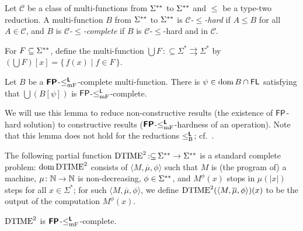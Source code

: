 \documentclass[envcountsame,orivec,oribibl]{llncs}
\newcommand{\pcolon}{\mathpunct{\,:\subseteq}}
\begin{document}
Let $\mathcal{C}$ be a class of multi-functions from $\Sigma ^{**}$ to $\Sigma ^{**}$
and $\leq$ be a type-two reduction.
A multi-function $B$ from $\Sigma ^{**}$ to $\Sigma ^{**}$ is \emph{$\mathcal{C}$-$\leq$-hard} if $A \leq B$ for all $A \in \mathcal{C}$,
and $B$ is \emph{$\mathcal{C}$-$\leq$-complete} 
if $B$ is $\mathcal{C}$-$\leq$-hard and in $\mathcal{C}$.


For $F \subseteq \Sigma ^{**}$, 
define the multi-function $\bigcup F \pcolon \Sigma ^* \rightrightarrows \Sigma ^*$ by
$(\bigcup F) [x] = \{\, f(x) \mid f \in F \,\}$.

\begin{lemma}
\label{lemma:P-complete}
Let $B$ be a $\text{\bfseries \sffamily \upshape FP}$-$\leq _{\mathrm{mF}} ^{\text{\bfseries \sffamily \upshape L}}$-complete multi-function.
There is $\psi \in \mathop{\rm dom} B \cap \mathsf{FL}$ satisfying that
 $\bigcup (B[\psi])$ is $\mathsf{FP}$-$\le^{\mathsf{L}}_{\mathrm{mF}}$-complete.
\end{lemma}

We will use this lemma to reduce 
non-constructive results (the existence of $\mathsf{FP}$-hard solution) to
constructive results ($\text{\bfseries \sffamily \upshape FP}$-$\leq _{\mathrm{mF}} ^{\text{\bfseries \sffamily \upshape L}}$-hardness of an operation).
Note that this lemma does not hold for
the reductions $\leq _{\mathrm B} ^{\text{\bfseries \sffamily \upshape L}}$; cf.~\cite[Lemma~3.6]{kawamura2012complexity}.

The following partial function $\probDTIMEtwo \pcolon \LM \to \LM$ 
is a standard complete problem: 
$\mathop{\rm dom} \mathrm{DTIME}^2$ consists of $\langle M, \overline \mu, \phi \rangle$
such that $M$ is (the program of) a machine, 
$\mu \colon \mathbb N \to \mathbb N$ is non-decreasing, 
$\phi \in \Sigma ^{**}$, 
and $M^\phi(x)$ stops in $\mu(|x|)$ steps for all $x \in \Sigma^*$; 
for such $\langle M, \overline \mu, \phi \rangle$, 
we define $\mathrm{DTIME}^2(\langle M, \overline \mu, \phi \rangle)(x)$ to be 
the output of the computation $M^\phi(x)$.

\begin{lemma}
\label{lemma: probDTIMEtwo}
 $\mathrm{DTIME}^2$ is $\text{\bfseries \sffamily \upshape FP}$-$\leq _{\mathrm{mF}} ^{\text{\bfseries \sffamily \upshape L}}$-complete.
\end{lemma}


\end{document}
